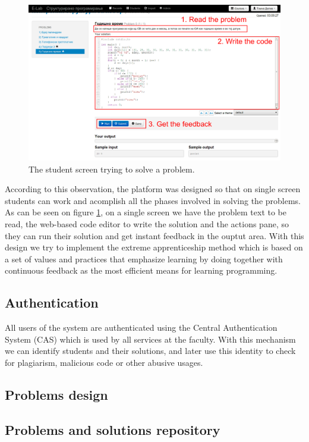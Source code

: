\documentclass{article}
\begin{document}
\begin{figure}
\centering
\includegraphics[width=.99\textwidth]{e-lab/user_screen}
\caption{The student screen trying to solve a problem.}
\label{fig:student_screen}
\end{figure}

According to this observation, the platform was designed so that on single
screen students can work and acomplish all the phases involved in solving the
problems. As can be seen on figure \ref{fig:student_screen}, on a single screen
we have the problem text to be read, the web-based code editor to write the
solution and the actions pane, so they can run their solution and get instant
feedback in the ouptut area. With this design we try to implement the extreme
apprenticeship method \cite{vihavainen2011extreme} which is based on a set of
values and practices that emphasize learning by doing together with continuous
feedback as the most efficient means for learning programming.

\subsection{Authentication}
All users of the system are authenticated using the Central Authentication
System (CAS) which is used by all services at the faculty. With this mechanism
we can identify students and their solutions, and later use this identity to
check for plagiarism, malicious code or other abusive usages. 

\subsection{Problems design}

\subsection{Problems and solutions repository}
\end{document}
